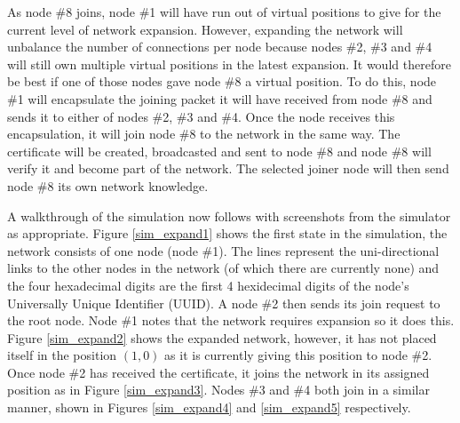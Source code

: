 \documentclass[ %
                    author={Luke Murray},
                supervisor={Dr. Simon Hollis},
                     title={Shadow Peer-to-Peer Networks},
                  subtitle={},
                    degree={MEng},
                      year={2013} ]{thesis}
\begin{document}
As node \#8 joins, node \#1 will have run out of virtual positions to give for the current level of network expansion. However, expanding the network will unbalance the number of connections per node because nodes \#2, \#3 and \#4 will still own multiple virtual positions in the latest expansion. It would therefore be best if one of those nodes gave node \#8 a virtual position. To do this, node \#1 will encapsulate the joining packet it will have received from node \#8 and sends it to either of nodes \#2, \#3 and \#4. Once the node receives this encapsulation, it will join node \#8 to the network in the same way. The certificate will be created, broadcasted and sent to node \#8 and node \#8 will verify it and become part of the network. The selected joiner node will then send node \#8 its own network knowledge.

A walkthrough of the simulation now follows with screenshots from the simulator as appropriate. Figure \ref{sim_expand1} shows the first state in the simulation, the network consists of one node (node \#1). The lines represent the uni-directional links to the other nodes in the network (of which there are currently none) and the four hexadecimal digits are the first 4 hexidecimal digits of the node's Universally Unique Identifier (UUID). A node \#2 then sends its join request to the root node. Node \#1 notes that the network requires expansion so it does this. Figure \ref{sim_expand2} shows the expanded network, however, it has not placed itself in the position $(1,0)$ as it is currently giving this position to node \#2. Once node \#2 has received the certificate, it joins the network in its assigned position as in Figure \ref{sim_expand3}. Nodes \#3 and \#4 both join in a similar manner, shown in Figures \ref{sim_expand4} and \ref{sim_expand5} respectively.
\end{document}

